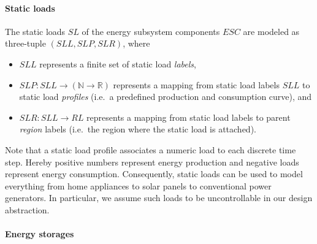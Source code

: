 \paragraph{Static loads}
\label{static_loads}

The static loads $SL$ of the energy subsystem components $ESC$ are modeled as three-tuple $(SLL, SLP, SLR)$, where
\begin{itemize}
	\item $SLL$ represents a finite set of static load \textit{labels},
	\item $SLP: SLL \rightarrow (\mathbb{N} \rightarrow \mathbb{R})$ represents a mapping from static load labels $SLL$ to static load \textit{profiles} (i.e.\ a predefined production and consumption curve), and
	\item $SLR: SLL \rightarrow RL$ represents a mapping from static load labels to parent \textit{region} labels (i.e.\ the region where the static load is attached).
\end{itemize}
Note that a static load profile associates a numeric load to each discrete time step. Hereby positive numbers represent energy production and negative loads represent energy consumption. Consequently, static loads can be used to model everything from home appliances to solar panels to conventional power generators. In particular, we assume such loads to be uncontrollable in our design abstraction.

\paragraph{Energy storages}
\label{energy_storages}

